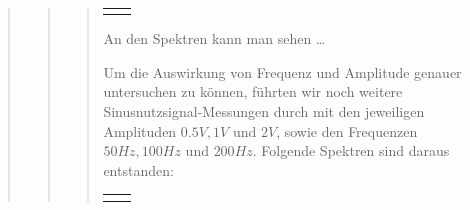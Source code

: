 \begin{quote}
\begin{quote}
\begin{quote}
\begin{center}
\begin{tabular}{ll}
\begin{minipage}{0.6\textwidth}
                \end{minipage}

            \end{tabular}
            \end{center}
        
        An den Spektren kann man sehen \ldots \\
        
        Um die Auswirkung von Frequenz und Amplitude genauer untersuchen zu
        können, führten wir noch weitere Sinusnutzsignal-Messungen durch mit den
        jeweiligen Amplituden $0.5V, 1V$ und $2V$, sowie den Frequenzen $50Hz,
        100Hz$ und $200Hz$. Folgende Spektren sind daraus entstanden:
        
               \begin{center}
            \begin{tabular}{ll}

            \hspace{-10em}
                \begin{minipage}{0.6\textwidth}


\end{minipage}
\end{tabular}
\end{center}
\end{quote}
\end{quote}
\end{quote}
